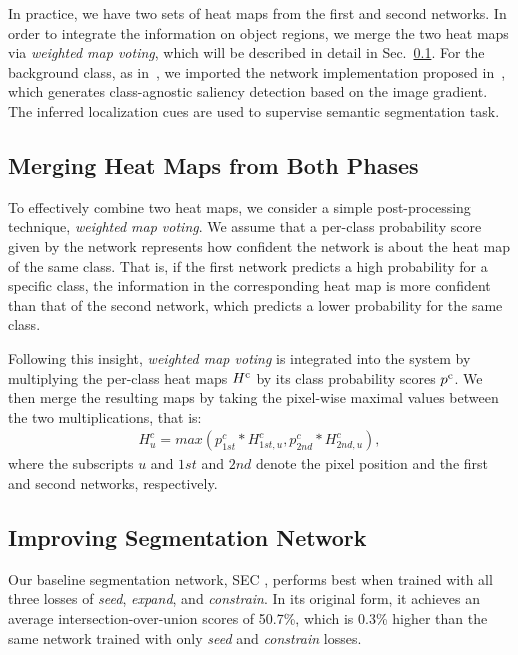 \documentclass[10pt,twocolumn,letterpaper]{article}
\newcommand{\secref}[1]{Sec.~\ref{#1}}
\begin{document}
In practice, we have two sets of heat maps from the first and second networks. In order to integrate the information on object regions, we merge the two heat maps via \textit{weighted map voting}, which will be described in detail in \secref{sec::merging}. For the background class, as in~\cite{kolesnikov2016seed},  we imported the network implementation proposed in~\cite{SimonyanVZ13bg}, which generates class-agnostic saliency detection based on the image gradient. The inferred localization cues are used to supervise semantic segmentation task.

\subsection{Merging Heat Maps from Both Phases}
\label{sec::merging}
To effectively combine two heat maps, we consider a simple post-processing technique, \textit{weighted map voting}. We assume that a per-class probability score given by the network represents how confident the network is about the heat map of the same class. That is, if the first network predicts a high probability for a specific class, the information in the corresponding heat map is more confident than that of the second network, which predicts a lower probability for the same class.

Following this insight, \textit{weighted map voting} is integrated into the system by multiplying the per-class heat maps ${H\textsuperscript{c}}$ by its class probability scores ${p\textsuperscript{c}}$. We then merge the resulting maps by taking the pixel-wise maximal values between the two multiplications, that is:  
\vspace{-1mm}
\begin{eqnarray}
   H_{u}^{c} =  max( p_{1st}^{c} * H_{1st,u}^{c}, p_{2nd}^{c} * H_{2nd,u}^{c}),
\label{eq:weightedMax}
\end{eqnarray}
where the subscripts $u$ and $1st$ and $2nd$ denote the pixel position and the first and second networks, respectively.



\subsection{Improving Segmentation Network}

Our baseline segmentation network, SEC \cite{kolesnikov2016seed}, performs best when trained with all three losses of \textit{seed}, \textit{expand}, and \textit{constrain}. In its original form, it achieves an average intersection-over-union scores of 50.7\%, which is 0.3\% higher than the same network trained with only \textit{seed} and \textit{constrain} losses. 
\end{document}
